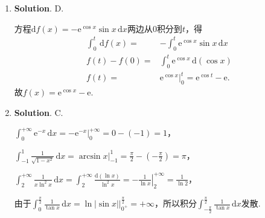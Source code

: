 \documentclass[../main.tex]{subfiles}
\begin{document}
\begin{enumerate}
    \item \textbf{Solution}. D.

          方程$\mathrm{d}f(x)=-\mathrm{e}^{\cos x}\sin x\,\mathrm{d}x$两边从$0$积分到$t$，得
          \[
              \begin{aligned}
                  \int_{0}^{t}\,\mathrm{d}f(x) = {} & -\int_{0}^{t}\mathrm{e}^{\cos x}\sin x\,\mathrm{d}x               \\
                  f(t)-f(0) = {}                    & \int_{0}^{t}\mathrm{e}^{\cos x}\,\mathrm{d}(\cos x)               \\
                  f(t)= {}                          & \mathrm{e}^{\cos x}\bigg|_{0}^{t}=\mathrm{e}^{\cos t}-\mathrm{e}.
              \end{aligned}
          \]
          故$f(x)=\mathrm{e}^{\cos x}-\mathrm{e}$.

    \item \textbf{Solution}. C.

          $\int_{0}^{+\infty}\mathrm{e}^{-x}\,\mathrm{d}x=-\mathrm{e}^{-x}\bigg|_{0}^{+\infty}
              =0-(-1)=1$，

          $\int_{-1}^{1}\frac{1}{\sqrt{1-x^{2}}}\,\mathrm{d}x=\arcsin x\bigg|_{-1}^{1}=
              \frac{\pi}{2}-\left(-\frac{\pi}{2}\right)=\pi$，

          $\int_{2}^{+\infty}\frac{1}{x\ln^{2} x}\,\mathrm{d}x=\int_{2}^{+\infty}\frac{\mathrm{d}(\ln
                  x)}{\ln^{2} x}=\left.-\frac{1}{\ln x}\right|_{2}^{+\infty}=\frac{1}{\ln 2}$，

          由于$\int_{0}^{\frac{\pi}{2}}\frac{1}{\tan x}\,\mathrm{d}x=\ln|\sin x|\bigg|_{0^+}
              ^{\frac{\pi}{2}}=+\infty$，所以积分$\int_{-\frac{\pi}{2}}^{\frac{\pi}{2}}\frac{1}{\tan
                  x}\,\mathrm{d}x$发散.
\end{enumerate}
\end{document}
